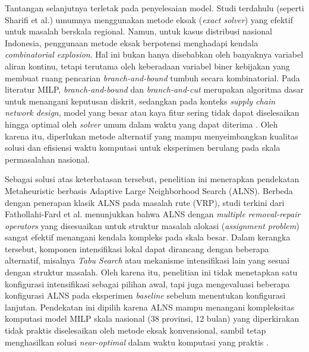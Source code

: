 \documentclass{file/TA-ITS}
\theoremstyle{definition}
\theoremstyle{definition}
\theoremstyle{plain}
\begin{document}
Tantangan selanjutnya terletak pada penyelesaian model. Studi terdahulu (seperti Sharifi et al.) umumnya menggunakan metode eksak (\textit{exact solver}) yang efektif untuk masalah berskala regional. Namun, untuk kasus distribusi nasional Indonesia, penggunaan metode eksak berpotensi menghadapi kendala \textit{combinatorial explosion}. Hal ini bukan hanya disebabkan oleh banyaknya variabel aliran kontinu, tetapi terutama oleh keberadaan variabel biner kebijakan yang membuat ruang pencarian \textit{branch-and-bound} tumbuh secara kombinatorial. Pada literatur MILP, \textit{branch-and-bound} dan \textit{branch-and-cut} merupakan algoritma dasar untuk menangani keputusan diskrit, sedangkan pada konteks \textit{supply chain network design}, model yang besar atau kaya fitur sering tidak dapat diselesaikan hingga optimal oleh \textit{solver} umum dalam waktu yang dapat diterima \cite{ntnu_milp,ESKANDARPOUR2017lns_supply}. Oleh karena itu, diperlukan metode alternatif yang mampu menyeimbangkan kualitas solusi dan efisiensi waktu komputasi untuk eksperimen berulang pada skala permasalahan nasional.

Sebagai solusi atas keterbatasan tersebut, penelitian ini menerapkan 
pendekatan Metaheuristic berbasis Adaptive Large Neighborhood Search (ALNS). 
Berbeda dengan penerapan klasik ALNS pada masalah rute (VRP), studi terkini 
dari Fathollahi-Fard et al. menunjukkan bahwa ALNS dengan \textit{multiple} 
\textit{removal-repair operators} yang disesuaikan untuk struktur masalah alokasi 
(\textit{assignment problem}) sangat efektif menangani kendala kompleks pada skala 
besar. Dalam kerangka tersebut, komponen intensifikasi lokal dapat dirancang dengan beberapa alternatif, misalnya \textit{Tabu Search} atau mekanisme intensifikasi lain yang sesuai dengan struktur masalah. Oleh karena itu, penelitian ini tidak menetapkan satu konfigurasi intensifikasi sebagai pilihan awal, tapi juga mengevaluasi beberapa konfigurasi ALNS pada eksperimen \textit{baseline} sebelum menentukan konfigurasi lanjutan. Pendekatan ini dipilih karena ALNS mampu menangani kompleksitas komputasi model MILP skala nasional (38 provinsi, 12 bulan) yang diperkirakan tidak praktis diselesaikan oleh metode eksak konvensional, sambil tetap menghasilkan solusi \textit{near-optimal} dalam waktu komputasi yang praktis \cite{fathollahifard2023alns}.
\end{document}

